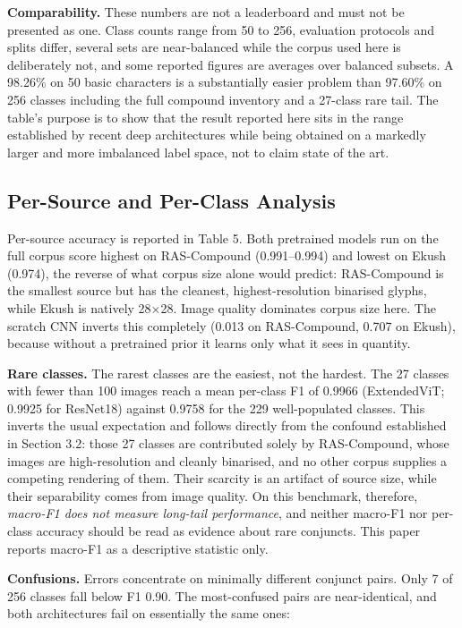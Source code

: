 \textbf{Comparability.} These numbers are not a leaderboard and must not be presented as one. Class counts range from 50 to 256, evaluation protocols and splits
differ, several sets are near-balanced while the corpus used here is deliberately not,
and some reported figures are averages over balanced subsets. A 98.26\%
on 50 basic characters \citep{ref17} is a substantially easier problem than
97.60\% on 256 classes including the full compound inventory and a
27-class rare tail. The table's purpose is to show that the result reported here sits
in the range established by recent deep architectures while being
obtained on a markedly larger and more imbalanced label space, not to
claim state of the art.

\hypertarget{per-source-and-per-class-analysis}{%
\subsection{Per-Source and Per-Class
Analysis}\label{per-source-and-per-class-analysis}}

Per-source accuracy is reported in Table 5. Both pretrained models run on the full corpus score highest on RAS-Compound (0.991--0.994) and lowest on Ekush
(0.974), the reverse of what corpus size alone would predict:
RAS-Compound is the smallest source but has the cleanest,
highest-resolution binarised glyphs, while Ekush is natively 28×28.
Image quality dominates corpus size here. The scratch CNN inverts this
completely (0.013 on RAS-Compound, 0.707 on Ekush), because without a
pretrained prior it learns only what it sees in quantity.

\textbf{Rare classes.} The rarest classes are the easiest, not the hardest. The 27 classes
with fewer than 100 images reach a mean per-class F1 of 0.9966
(ExtendedViT; 0.9925 for ResNet18) against 0.9758 for the 229
well-populated classes. This inverts the
usual expectation and follows directly from the confound established in
Section 3.2: those 27 classes are contributed solely by RAS-Compound,
whose images are high-resolution and cleanly binarised, and no other
corpus supplies a competing rendering of them. Their scarcity is an
artifact of source size, while their separability comes from image
quality. On this benchmark, therefore, \emph{macro-F1 does not measure
long-tail performance}, and neither macro-F1 nor per-class accuracy
should be read as evidence about rare conjuncts. This paper reports macro-F1 as a
descriptive statistic only.

\textbf{Confusions.} Errors concentrate on minimally different conjunct pairs. Only
7 of 256 classes fall below F1 0.90. The most-confused pairs are
near-identical, and both architectures fail on essentially the same
ones:

